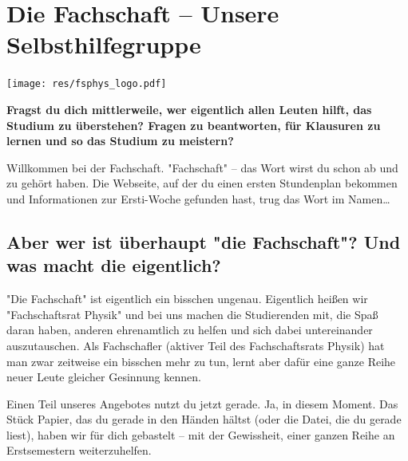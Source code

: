 \section[Die Fachschaft]{Die Fachschaft -- Unsere Selbsthilfegruppe}
\label{fsphys:sec}
\begin{center}
	\vspace{-0.5cm}
	\texttt{[image: res/fsphys\_logo.pdf]}
	\vspace{-0.5cm}
\end{center}
\begin{multicols}{2}
\fibelspacingsubsubsection[subsection]

\textbf{Fragst du dich mittlerweile, wer eigentlich allen Leuten hilft, das Studium zu überstehen? Fragen zu beantworten, für Klausuren zu lernen und so das Studium zu meistern?}

Willkommen bei der Fachschaft.
"Fachschaft" -- das Wort wirst du schon ab und zu gehört haben.
Die Webseite, auf der du einen ersten Stundenplan bekommen und Informationen zur Ersti-Woche gefunden hast, trug das Wort im Namen\dots

\subsection*{Aber wer ist überhaupt "die Fachschaft"? Und was macht die eigentlich?}
"Die Fachschaft" ist eigentlich ein bisschen ungenau.
Eigentlich heißen wir "Fachschaftsrat Physik" und bei uns machen die Studierenden mit, die Spaß daran haben, anderen ehrenamtlich zu helfen und sich dabei untereinander auszutauschen.
Als Fachschafler (aktiver Teil des Fachschaftsrats Physik) hat man zwar zeitweise ein bisschen mehr zu tun, lernt aber dafür eine ganze Reihe neuer Leute gleicher Gesinnung kennen.

Einen Teil unseres Angebotes nutzt du jetzt gerade.
Ja, in diesem Moment.
Das Stück Papier, das du gerade in den Händen hältst (oder die Datei, die du gerade liest), haben wir für dich gebastelt -- mit der Gewissheit, einer ganzen Reihe an Erstsemestern weiterzuhelfen.


\end{multicols}
